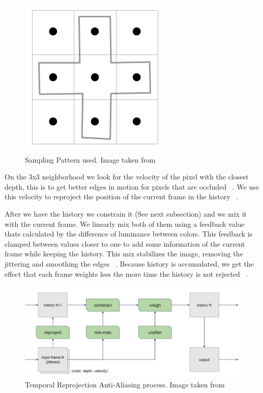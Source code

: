 \documentclass{acmsiggraph}               %
\begin{document}
\begin{figure}[H]
    \centering
    \includegraphics[scale=0.3]{Pattern.png}
    \caption{Sampling Pattern used. Image taken from \protect\cite{Fuglsand2016}}
    \label{fig_Pattern}
\end{figure}

On the 3x3 neighborhood we look for the velocity of the pixel with the closest depth, this is to get better edges in motion for pixels that are occluded ~\cite{Fuglsand2016}. We use this velocity to reproject the position of the current frame in the history ~\cite{Fuglsand2016,XU2016}.

After we have the history we constrain it (See next subsection) and we mix it with the current frame. We linearly mix both of them using a feedback value thats calculated by the difference of luminance between colors. This feedback is clamped between values closer to one to add some information of the current frame while keeping the history. This mix stabilizes the image, removing the jittering and smoothing the edges ~\cite{Fuglsand2016,XU2016}. Because history is accumulated, we get the effect that each frame weights less the more time the history is not rejected ~\cite{Fuglsand2016}.


\begin{figure}[H]
    \centering
    \includegraphics[width=0.9\columnwidth]{Process.png}
    \caption{Temporal Reprojection Anti-Aliasing process. Image taken from \protect\cite{Fuglsand2016}}
    \label{fig_Process}
\end{figure}
\end{document}
